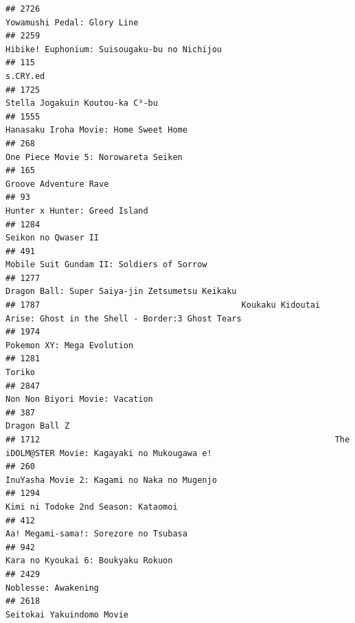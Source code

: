 \documentclass[
]{article}
\begin{document}
\begin{verbatim}
## 2726                                                                               Yowamushi Pedal: Glory Line
## 2259                                                              Hibike! Euphonium: Suisougaku-bu no Nichijou
## 115                                                                                                   s.CRY.ed
## 1725                                                                           Stella Jogakuin Koutou-ka C³-bu
## 1555                                                                     Hanasaku Iroha Movie: Home Sweet Home
## 268                                                                       One Piece Movie 5: Norowareta Seiken
## 165                                                                                      Groove Adventure Rave
## 93                                                                               Hunter x Hunter: Greed Island
## 1284                                                                                       Seikon no Qwaser II
## 491                                                                  Mobile Suit Gundam II: Soldiers of Sorrow
## 1277                                                           Dragon Ball: Super Saiya-jin Zetsumetsu Keikaku
## 1787                                         Koukaku Kidoutai Arise: Ghost in the Shell - Border:3 Ghost Tears
## 1974                                                                                Pokemon XY: Mega Evolution
## 1281                                                                                                    Toriko
## 2847                                                                            Non Non Biyori Movie: Vacation
## 387                                                                                              Dragon Ball Z
## 1712                                                            The iDOLM@STER Movie: Kagayaki no Mukougawa e!
## 260                                                                InuYasha Movie 2: Kagami no Naka no Mugenjo
## 1294                                                                       Kimi ni Todoke 2nd Season: Kataomoi
## 412                                                                      Aa! Megami-sama!: Sorezore no Tsubasa
## 942                                                                         Kara no Kyoukai 6: Boukyaku Rokuon
## 2429                                                                                       Noblesse: Awakening
## 2618                                                                                 Seitokai Yakuindomo Movie

\end{verbatim}
\end{document}
